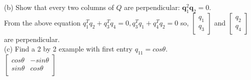 \documentclass[10pt,twoside,reqno]{article}
\begin{document}
\begin{enumerate}
\vspace{3mm}
(b) Show that every two columns of $Q$ are perpendicular: $\pmb{q}_1^2\pmb{q}_2 = 0$.\\
\vspace{3mm}
From the above equation $q_1^Tq_2 + q_3^Tq_4 = 0,  q_3^Tq_1 + q_4^Tq_2 = 0$ so,  $\left[\begin{smallmatrix} q_1\\ q_3 \end{smallmatrix} \right]$ and  $\left[\begin{smallmatrix} q_2\\ q_4 \end{smallmatrix} \right]$ are perpendicular.\\
\vspace{3mm}
(c) Find a 2 by 2 example with first entry $q_{11} = cos\theta$.\\
\vspace{3mm}
$
$$
\begin{bmatrix}
cos\theta & -sin\theta\\
sin\theta & cos \theta\\
\end{bmatrix}
$$
$
\vspace{3mm}
\end{enumerate}
\end{document}
